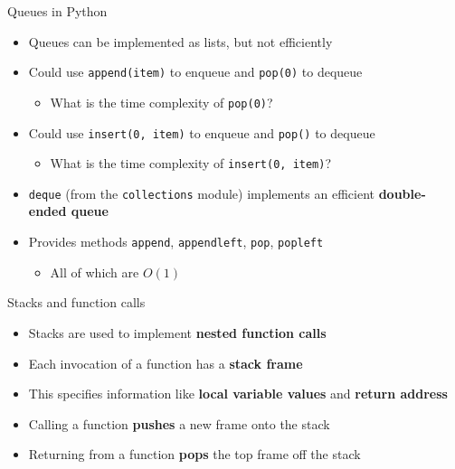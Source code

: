 \begin{frame}{Queues in Python}
	\begin{itemize}
		\pause\item Queues can be implemented as lists, but not efficiently
		\pause\item Could use \lstinline{append(item)} to enqueue and \lstinline{pop(0)} to dequeue
			\begin{itemize}
				\pause\item What is the time complexity of \lstinline{pop(0)}?
			\end{itemize}
		\pause\item Could use \lstinline{insert(0, item)} to enqueue and \lstinline{pop()} to dequeue
			\begin{itemize}
				\pause\item What is the time complexity of \lstinline{insert(0, item)}?
			\end{itemize}
		\pause\item \lstinline{deque} (from the \lstinline{collections} module) implements an efficient
			\textbf{double-ended queue}
		\pause\item Provides methods \lstinline{append}, \lstinline{appendleft}, \lstinline{pop}, \lstinline{popleft}
			\begin{itemize}
				\pause\item All of which are $O(1)$
			\end{itemize}
	\end{itemize}
\end{frame}

\begin{frame}{Stacks and function calls}
	\begin{itemize}
		\pause\item Stacks are used to implement \textbf{nested function calls}
		\pause\item Each invocation of a function has a \textbf{stack frame}
		\pause\item This specifies information like \textbf{local variable values} and \textbf{return address}
		\pause\item Calling a function \textbf{pushes} a new frame onto the stack
		\pause\item Returning from a function \textbf{pops} the top frame off the stack
	\end{itemize}
\end{frame}
